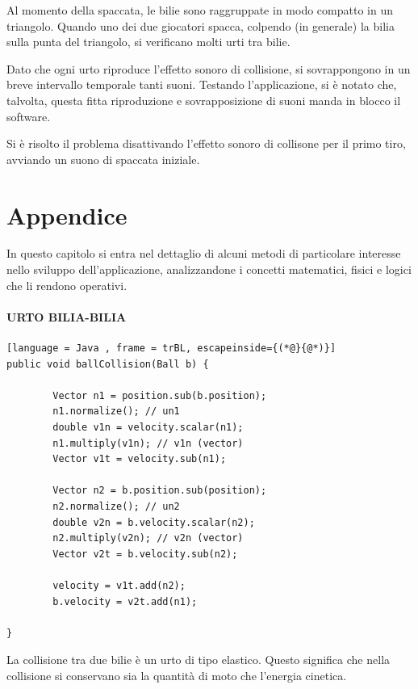 \documentclass[12pt,a4paper]{report}
\begin{document}
\vspace{3mm}

Al momento della spaccata, le bilie sono raggruppate in modo compatto in un triangolo. Quando uno dei due giocatori spacca, colpendo (in generale) la bilia sulla punta del triangolo, si verificano molti urti tra bilie.

Dato che ogni urto riproduce l'effetto sonoro di collisione, si sovrappongono in un breve intervallo temporale tanti suoni.
Testando l'applicazione, si è notato che, talvolta, questa fitta riproduzione e sovrapposizione di suoni manda in blocco il software.

\vspace{3mm}

Si è risolto il problema disattivando l'effetto sonoro di collisone per il primo tiro, avviando un suono di spaccata iniziale.


\chapter{Appendice}\label{ch:Appendix} %
In questo capitolo si entra nel dettaglio di alcuni metodi di particolare interesse nello sviluppo dell'applicazione, analizzandone i concetti matematici, fisici e logici che li rendono operativi.

\subsubsection*{URTO BILIA-BILIA}

\begin{lstlisting}[language = Java , frame = trBL, escapeinside={(*@}{@*)}]
public void ballCollision(Ball b) {

        Vector n1 = position.sub(b.position);
        n1.normalize(); // un1
        double v1n = velocity.scalar(n1);
        n1.multiply(v1n); // v1n (vector)
        Vector v1t = velocity.sub(n1);

        Vector n2 = b.position.sub(position);
        n2.normalize(); // un2
        double v2n = b.velocity.scalar(n2);
        n2.multiply(v2n); // v2n (vector)
        Vector v2t = b.velocity.sub(n2);
        
        velocity = v1t.add(n2);
        b.velocity = v2t.add(n1);
        
}
\end{lstlisting}

\pagebreak

La collisione tra due bilie\cite{2DCollision} è un urto di tipo elastico. Questo significa che nella collisione si conservano sia la quantità di moto che l'energia cinetica.
\end{document}

